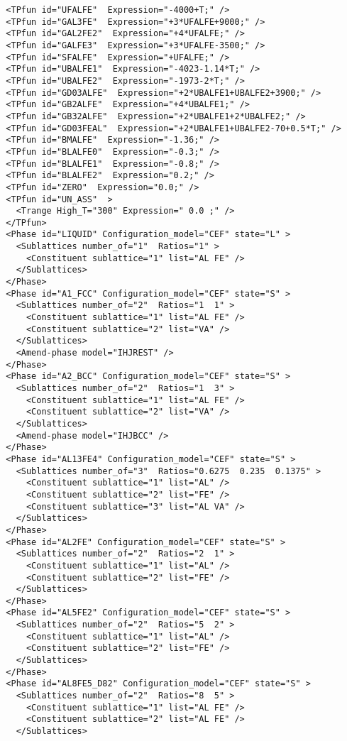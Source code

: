\documentclass[12pt]{article}
\begin{document}
\begin{appendices}
{\begin{verbatim}
  <TPfun id="UFALFE"  Expression="-4000+T;" />
  <TPfun id="GAL3FE"  Expression="+3*UFALFE+9000;" />
  <TPfun id="GAL2FE2"  Expression="+4*UFALFE;" />
  <TPfun id="GALFE3"  Expression="+3*UFALFE-3500;" />
  <TPfun id="SFALFE"  Expression="+UFALFE;" />
  <TPfun id="UBALFE1"  Expression="-4023-1.14*T;" />
  <TPfun id="UBALFE2"  Expression="-1973-2*T;" />
  <TPfun id="GD03ALFE"  Expression="+2*UBALFE1+UBALFE2+3900;" />
  <TPfun id="GB2ALFE"  Expression="+4*UBALFE1;" />
  <TPfun id="GB32ALFE"  Expression="+2*UBALFE1+2*UBALFE2;" />
  <TPfun id="GD03FEAL"  Expression="+2*UBALFE1+UBALFE2-70+0.5*T;" />
  <TPfun id="BMALFE"  Expression="-1.36;" />
  <TPfun id="BLALFE0"  Expression="-0.3;" />
  <TPfun id="BLALFE1"  Expression="-0.8;" />
  <TPfun id="BLALFE2"  Expression="0.2;" />
  <TPfun id="ZERO"  Expression="0.0;" />
  <TPfun id="UN_ASS"  >
    <Trange High_T="300" Expression=" 0.0 ;" />
  </TPfun>
  <Phase id="LIQUID" Configuration_model="CEF" state="L" >
    <Sublattices number_of="1"  Ratios="1" >
      <Constituent sublattice="1" list="AL FE" />
    </Sublattices>
  </Phase>
  <Phase id="A1_FCC" Configuration_model="CEF" state="S" >
    <Sublattices number_of="2"  Ratios="1  1" >
      <Constituent sublattice="1" list="AL FE" />
      <Constituent sublattice="2" list="VA" />
    </Sublattices>
    <Amend-phase model="IHJREST" />
  </Phase>
  <Phase id="A2_BCC" Configuration_model="CEF" state="S" >
    <Sublattices number_of="2"  Ratios="1  3" >
      <Constituent sublattice="1" list="AL FE" />
      <Constituent sublattice="2" list="VA" />
    </Sublattices>
    <Amend-phase model="IHJBCC" />
  </Phase>
  <Phase id="AL13FE4" Configuration_model="CEF" state="S" >
    <Sublattices number_of="3"  Ratios="0.6275  0.235  0.1375" >
      <Constituent sublattice="1" list="AL" />
      <Constituent sublattice="2" list="FE" />
      <Constituent sublattice="3" list="AL VA" />
    </Sublattices>
  </Phase>
  <Phase id="AL2FE" Configuration_model="CEF" state="S" >
    <Sublattices number_of="2"  Ratios="2  1" >
      <Constituent sublattice="1" list="AL" />
      <Constituent sublattice="2" list="FE" />
    </Sublattices>
  </Phase>
  <Phase id="AL5FE2" Configuration_model="CEF" state="S" >
    <Sublattices number_of="2"  Ratios="5  2" >
      <Constituent sublattice="1" list="AL" />
      <Constituent sublattice="2" list="FE" />
    </Sublattices>
  </Phase>
  <Phase id="AL8FE5_D82" Configuration_model="CEF" state="S" >
    <Sublattices number_of="2"  Ratios="8  5" >
      <Constituent sublattice="1" list="AL FE" />
      <Constituent sublattice="2" list="AL FE" />
    </Sublattices>

\end{verbatim}}
\end{appendices}
\end{document}
